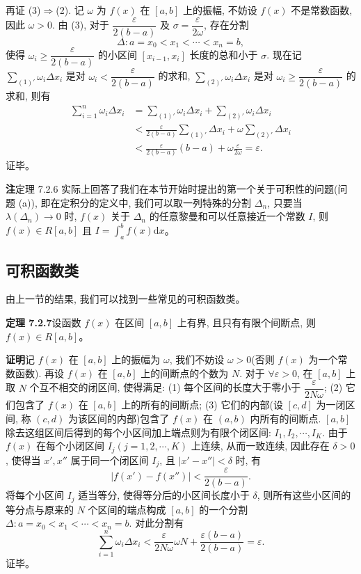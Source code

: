 \documentclass[UTF8,12pt,a4paper,fontset=fandol]{ctexart}
\begin{document}
再证 (3)$\Rightarrow$(2). 记 $\omega$ 为 $f(x)$ 在 $[a,b]$ 上的振幅, 不妨设 $f(x)$ 不是常数函数, 因此 $\omega>0$. 由 (3), 对于 $\dfrac{\varepsilon}{2(b-a)}$ 及 $\sigma=\dfrac{\varepsilon}{2\omega}$, 存在分割
\[
  \Delta:a=x_0<x_1<\cdots<x_n=b,
\]
使得 $\omega_i\geq\dfrac{\varepsilon}{2(b-a)}$ 的小区间 $[x_{i-1},x_i]$ 长度的总和小于 $\sigma$. 现在记 $\sum_{(1)'}\omega_i\Delta x_i$ 是对 $\omega_i<\dfrac{\varepsilon}{2(b-a)}$ 的求和, $\sum_{(2)'}\omega_i\Delta x_i$ 是对 $\omega_i\geq\dfrac{\varepsilon}{2(b-a)}$ 的求和, 则有
\[
\begin{aligned}
  \sum_{i=1}^n\omega_i\Delta x_i
  &=\sum_{(1)'}\omega_i\Delta x_i+\sum_{(2)'}\omega_i\Delta x_i\\
  &<\frac{\varepsilon}{2(b-a)}\sum_{(1)'}\Delta x_i+\omega\sum_{(2)'}\Delta x_i\\
  &<\frac{\varepsilon}{2(b-a)}(b-a)+\omega\frac{\varepsilon}{2\omega}
  =\varepsilon.
\end{aligned}
\]
证毕。

\noindent\textbf{注}\quad 定理 7.2.6 实际上回答了我们在本节开始时提出的第一个关于可积性的问题(问题 (a)), 即在定积分的定义中, 我们可以取一列特殊的分割 $\Delta_n$, 只要当 $\lambda(\Delta_n)\to0$ 时, $f(x)$ 关于 $\Delta_n$ 的任意黎曼和可以任意接近一个常数 $I$, 则 $f(x)\in R[a,b]$ 且 $I=\int_a^b f(x)\mathrm dx$。

\subsection{可积函数类}

由上一节的结果, 我们可以找到一些常见的可积函数类。

\noindent\textbf{定理 7.2.7}\quad 设函数 $f(x)$ 在区间 $[a,b]$ 上有界, 且只有有限个间断点, 则 $f(x)\in R[a,b]$。

\noindent\textbf{证明}\quad 记 $f(x)$ 在 $[a,b]$ 上的振幅为 $\omega$, 我们不妨设 $\omega>0$(否则 $f(x)$ 为一个常数函数). 再设 $f(x)$ 在 $[a,b]$ 上的间断点的个数为 $N$. 对于 $\forall\varepsilon>0$, 在 $[a,b]$ 上取 $N$ 个互不相交的闭区间, 使得满足: (1) 每个区间的长度大于零小于 $\dfrac{\varepsilon}{2N\omega}$; (2) 它们包含了 $f(x)$ 在 $[a,b]$ 上的所有的间断点; (3) 它们的内部(设 $[c,d]$ 为一闭区间, 称 $(c,d)$ 为该区间的内部)包含了 $f(x)$ 在 $(a,b)$ 内所有的间断点. $[a,b]$ 除去这组区间后得到的每个小区间加上端点则为有限个闭区间: $I_1,I_2,\cdots,I_K$. 由于 $f(x)$ 在每个小闭区间 $I_j(j=1,2,\cdots,K)$ 上连续, 从而一致连续, 因此存在 $\delta>0$, 使得当 $x',x''$ 属于同一个闭区间 $I_j$, 且 $|x'-x''|<\delta$ 时, 有
\[
  |f(x')-f(x'')|<\frac{\varepsilon}{2(b-a)}.
\]
将每个小区间 $I_j$ 适当等分, 使得等分后的小区间长度小于 $\delta$, 则所有这些小区间的等分点与原来的 $N$ 个区间的端点构成 $[a,b]$ 的一个分割 $\Delta:a=x_0<x_1<\cdots<x_n=b$. 对此分割有
\[
  \sum_{i=1}^n\omega_i\Delta x_i< \frac{\varepsilon}{2N\omega}\omega N+\frac{\varepsilon(b-a)}{2(b-a)}=\varepsilon.
\]
证毕。
\end{document}
